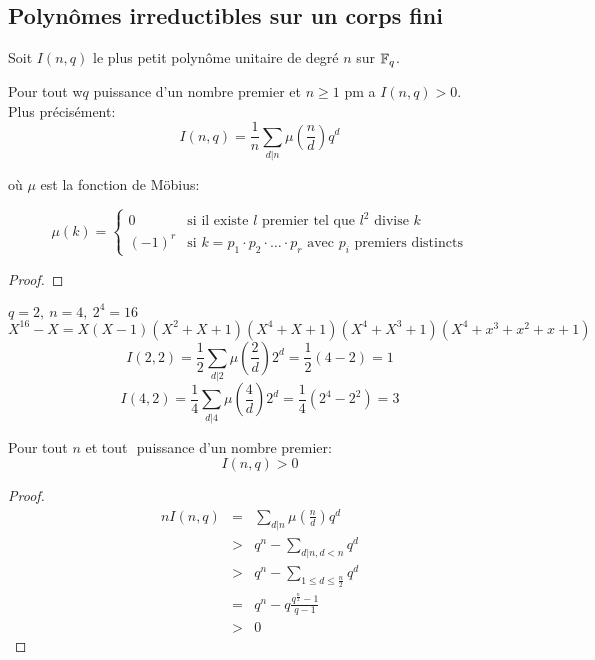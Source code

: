 \subsection{Polynômes irreductibles sur un corps fini}


Soit $I(n,q)$ le plus petit polynôme unitaire de degré $n$ sur $\mathbb{F}_q$.

\begin{theorem}
	Pour tout w$q$ puissance d'un nombre premier et $n \geq 1$ pm a $I(n,q) > 0$.\\

	Plus précisément:
	$$ I(n,q) = \frac{1}{n} \sum_{d|n} \mu(\frac{n}{d}) q^d$$

	où $\mu$ est la fonction de Möbius:

	\[ \mu(k) = \left\{\begin{array}{ll}
			0      & \text{si il existe } l \text{ premier tel que } l^2 \text{ divise } k                            \\
			(-1)^r & \text{si } k = p_1 \cdot p_2 \cdot \ldots \cdot p_r \text{ avec } p_i \text{ premiers distincts}
		\end{array} \right.\]

\end{theorem}

\begin{proof}
\end{proof}

\begin{example}
	$ q = 2, \ n = 4, \ 2^4 = 16 $
	$$	X ^16 - X = X(X-1)(X^2 + X + 1)(X^4 + X + 1)(X^4 + X^3 + 1)(X^4 + x^3 + x^2 + x + 1) $$
	$$	I(2,2) = \frac{1}{2}\sum_{d|2} \mu(\frac{2}{d}) 2^d = \frac{1}{2}(4-2) = 1$$
	$$	I(4,2) = \frac{1}{4}\sum_{d|4} \mu(\frac{4}{d}) 2^d = \frac{1}{4}(2^4 - 2^2) = 3$$
\end{example}


\begin{coro}
	Pour tout $n$ et tout $ $ puissance d'un nombre premier:
	$$ I (n, q) > 0 $$
\end{coro}


\begin{proof}
	\begin{eqnarray*}
		n I(n, q) & = & \sum_{d|n} \mu(\frac{n}{d}) q^d \\
		&>& q^n - \sum_{d|n, d < n} q^d \\
		&>& q^n - \sum_{1 \leq d\leq \frac{n}{2}} q^d \\
		&=& q^n - q\frac{q^{\frac{n}{2}} - 1}{q-1} \\ %
		&>& 0
	\end{eqnarray*}
\end{proof}

